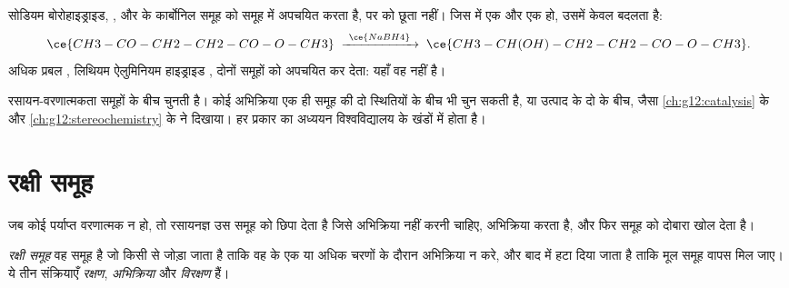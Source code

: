 \begin{example}[चुनने वाला एक अपचायक]\label{ex:g12:synthesis-strategy:nabh4}
सोडियम बोरोहाइड्राइड, ,  और  के कार्बोनिल समूह को
 समूह में अपचयित करता है, पर  को छूता नहीं। जिस
 में एक  और एक  हो, उसमें केवल  बदलता है:
\[
  \ce{CH3-CO-CH2-CH2-CO-O-CH3}
  \;\xrightarrow{\ \ce{NaBH4}\ }\;
  \ce{CH3-CH(OH)-CH2-CH2-CO-O-CH3} .
\]
अधिक प्रबल , लिथियम ऐलुमिनियम हाइड्राइड , दोनों
समूहों को अपचयित कर देता: यहाँ वह  नहीं है।
\end{example}

\begin{remark}\label{rem:g12:synthesis-strategy:kinds}
रसायन-वरणात्मकता समूहों के बीच चुनती है। कोई अभिक्रिया
एक ही समूह की दो स्थितियों के बीच भी चुन सकती है, या उत्पाद के दो 
के बीच, जैसा \cref{ch:g12:catalysis} के  और
\cref{ch:g12:stereochemistry} के   ने दिखाया। हर प्रकार का अध्ययन
विश्वविद्यालय के खंडों में होता है।
\end{remark}

\section{रक्षी समूह}

जब कोई  पर्याप्त वरणात्मक न हो, तो रसायनज्ञ उस समूह को छिपा देता है जिसे
अभिक्रिया नहीं करनी चाहिए, अभिक्रिया करता है, और फिर समूह को दोबारा खोल देता है।

\begin{definition}[रक्षी समूह]\label{def:g12:synthesis-strategy:protecting-group}
\emph{रक्षी समूह} वह समूह है जो किसी
 से जोड़ा जाता है ताकि वह  के एक या अधिक चरणों के दौरान
अभिक्रिया न करे, और बाद में हटा दिया जाता है ताकि मूल समूह वापस मिल जाए। ये
तीन संक्रियाएँ \emph{रक्षण}, \emph{अभिक्रिया} और
\emph{विरक्षण} हैं।
\end{definition}

